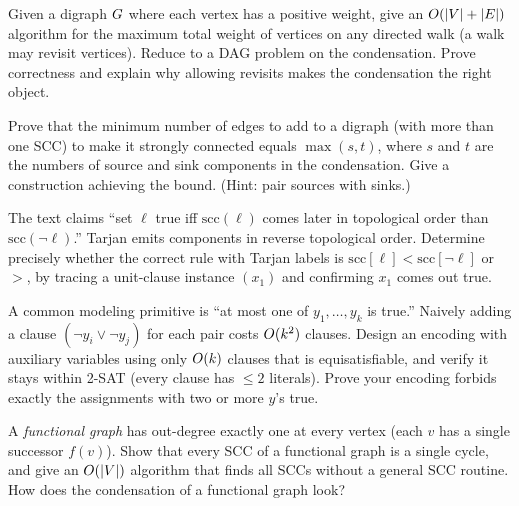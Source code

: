 \begin{exercise}
Given a digraph $G$ where each vertex has a positive weight, give an $O(\lvert V\rvert+\lvert E\rvert)$ algorithm for the maximum total weight of vertices on any directed walk (a walk may revisit vertices). Reduce to a DAG problem on the condensation. Prove correctness and explain why allowing revisits makes the condensation the right object.
\end{exercise}

\begin{exercise}
Prove that the minimum number of edges to add to a digraph (with more than one SCC) to make it strongly connected equals $\max(s,t)$, where $s$ and $t$ are the numbers of source and sink components in the condensation. Give a construction achieving the bound. (Hint: pair sources with sinks.)
\end{exercise}

\begin{exercise}
The text claims ``set $\ell$ true iff $\mathrm{scc}(\ell)$ comes later in topological order than $\mathrm{scc}(\lnot\ell)$.'' Tarjan emits components in reverse topological order. Determine precisely whether the correct rule with Tarjan labels is $\mathrm{scc}[\ell] < \mathrm{scc}[\lnot\ell]$ or $>$, by tracing a unit-clause instance $(x_1)$ and confirming $x_1$ comes out true.
\end{exercise}

\begin{exercise}
A common modeling primitive is ``at most one of $y_1,\dots,y_k$ is true.'' Naively adding a clause $(\lnot y_i\lor\lnot y_j)$ for each pair costs $O(k^2)$ clauses. Design an encoding with auxiliary variables using only $O(k)$ clauses that is equisatisfiable, and verify it stays within 2-SAT (every clause has $\le 2$ literals). Prove your encoding forbids exactly the assignments with two or more $y$'s true.
\end{exercise}

\begin{exercise}
A \emph{functional graph} has out-degree exactly one at every vertex (each $v$ has a single successor $f(v)$). Show that every SCC of a functional graph is a single cycle, and give an $O(\lvert V\rvert)$ algorithm that finds all SCCs without a general SCC routine. How does the condensation of a functional graph look?
\end{exercise}

